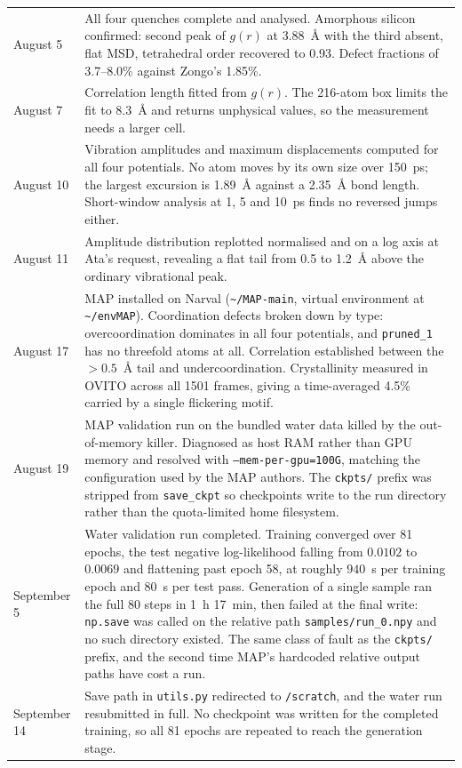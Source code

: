 \documentclass{article}
\begin{document}
\begin{longtable}{l|p{}}
August 5 & All four quenches complete and analysed. Amorphous silicon confirmed: second peak of $g(r)$ at 3.88~\AA{} with the third absent, flat MSD, tetrahedral order recovered to 0.93. Defect fractions of 3.7--8.0\% against Zongo's 1.85\%. \\
August 7 & Correlation length fitted from $g(r)$. The 216-atom box limits the fit to 8.3~\AA{} and returns unphysical values, so the measurement needs a larger cell. \\
August 10 & Vibration amplitudes and maximum displacements computed for all four potentials. No atom moves by its own size over 150~ps; the largest excursion is 1.89~\AA{} against a 2.35~\AA{} bond length. Short-window analysis at 1, 5 and 10~ps finds no reversed jumps either. \\
August 11 & Amplitude distribution replotted normalised and on a log axis at Ata's request, revealing a flat tail from 0.5 to 1.2~\AA{} above the ordinary vibrational peak. \\
August 17 & MAP installed on Narval (\texttt{\textasciitilde/MAP-main}, virtual environment at \texttt{\textasciitilde/envMAP}). Coordination defects broken down by type: overcoordination dominates in all four potentials, and \texttt{pruned\_1} has no threefold atoms at all. Correlation established between the $>0.5$~\AA{} tail and undercoordination. Crystallinity measured in OVITO across all 1501 frames, giving a time-averaged 4.5\% carried by a single flickering motif. \\
August 19 & MAP validation run on the bundled water data killed by the out-of-memory killer. Diagnosed as host RAM rather than GPU memory and resolved with \texttt{--mem-per-gpu=100G}, matching the configuration used by the MAP authors. The \texttt{ckpts/} prefix was stripped from \texttt{save\_ckpt} so checkpoints write to the run directory rather than the quota-limited home filesystem. \\
September 5 & Water validation run completed. Training converged over 81 epochs, the test negative log-likelihood falling from $0.0102$ to $0.0069$ and flattening past epoch 58, at roughly $940$~s per training epoch and $80$~s per test pass. Generation of a single sample ran the full 80 steps in 1~h 17~min, then failed at the final write: \texttt{np.save} was called on the relative path \texttt{samples/run\_0.npy} and no such directory existed. The same class of fault as the \texttt{ckpts/} prefix, and the second time MAP's hardcoded relative output paths have cost a run. \\
September 14 & Save path in \texttt{utils.py} redirected to \texttt{/scratch}, and the water run resubmitted in full. No checkpoint was written for the completed training, so all 81 epochs are repeated to reach the generation stage. \\
\end{longtable}
\end{document}
